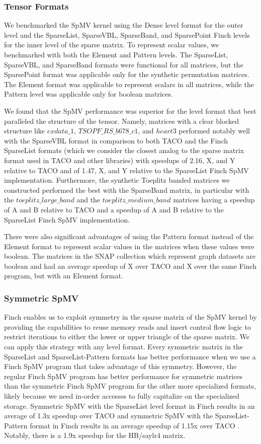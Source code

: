 \subsubsection{Tensor Formats}
We benchmarked the SpMV kernel using the Dense level format for the outer level and the SparseList, SparseVBL, SparseBand, and SparsePoint Finch levels for the inner level of the sparse matrix. To represent scalar values, we benchmarked with both the Element and Pattern levels. The SparseList, SparseVBL, and SparseBand formats were functional for all matrices, but the SparsePoint format was applicable only for the synthetic permutation matrices. The Element format was applicable to represent scalars in all matrices, while the Pattern level was applicable only for boolean matrices. 

We found that the SpMV performance was superior for the level format that best paralleled the structure of the tensor. Namely, matrices with a clear blocked structure like $exdata\_1$, $TSOPF\_RS\_b678\_c1$, and $heart3$ performed notably well with the SparseVBL format in comparison to both TACO and the Finch SparseList formats (which we consider the closest analog to the sparse matrix format used in TACO and other libraries) with speedups of 2.16, X, and Y relative to TACO and of 1.47, X, and Y relative to the SparseList Finch SpMV implementation. Furthermore, the synthetic Toeplitz banded matrices we constructed performed the best with the SparseBand matrix, in particular with the $toeplitz\_large\_band$ and the $toeplitz\_medium\_band$ matrices having a speedup of A and B relative to TACO and a speedup of A and B relative to the SparseList Finch SpMV implementation. 

There were also significant advantages of using the Pattern format instead of the Element format to represent scalar values in the matrices when these values were boolean. The matrices in the SNAP collection which represent graph datasets are boolean and had an average speedup of X over TACO and X over the same Finch program, but with an Element format.   


\subsubsection{Symmetric SpMV}
Finch enables us to exploit symmetry in the sparse matrix of the SpMV kernel by providing the capabilities to reuse memory reads and insert control flow logic to restrict iterations to either the lower or upper triangle of the sparse matrix. We can apply this strategy with any level format. Every symmetric matrix in the SparseList and SparseList-Pattern formats has better performance when we use a Finch SpMV program that takes advantage of this symmetry. However, the regular Finch SpMV program has better performance for symmetric matrices than the symmetric Finch SpMV program for the other more specialized formats, likely because we need in-order accesses to fully capitalize on the specialized storage. Symmetric SpMV with the SparseList level format in Finch results in an average of 1.3x speedup over TACO and symmetric SpMV with the SparseList-Pattern format in Finch results in an average speedup of 1.15x over TACO . Notably, there is a 1.9x speedup for the HB/saylr4 matrix. 

